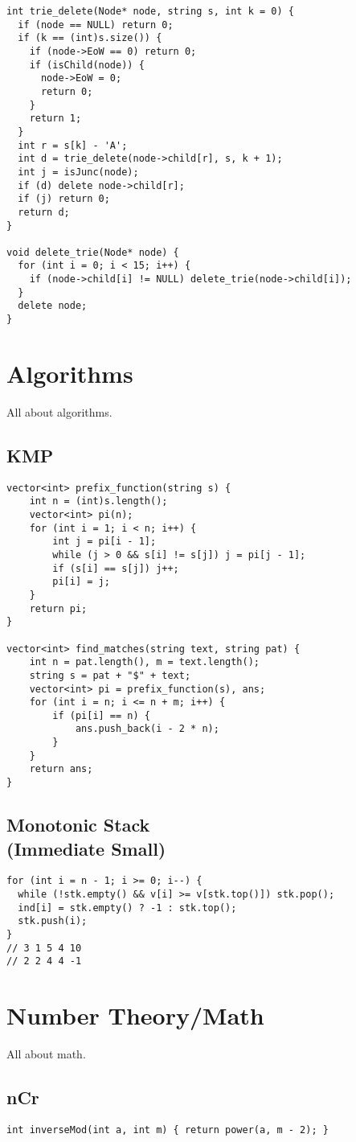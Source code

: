 \documentclass[10pt, a4paper]{article}
\begin{document}
\begin{multicols}{2}
\begin{lstlisting}
int trie_delete(Node* node, string s, int k = 0) {
  if (node == NULL) return 0;
  if (k == (int)s.size()) {
    if (node->EoW == 0) return 0;
    if (isChild(node)) {
      node->EoW = 0;
      return 0;
    }
    return 1;
  }
  int r = s[k] - 'A';
  int d = trie_delete(node->child[r], s, k + 1);
  int j = isJunc(node);
  if (d) delete node->child[r];
  if (j) return 0;
  return d;
}

void delete_trie(Node* node) {
  for (int i = 0; i < 15; i++) {
    if (node->child[i] != NULL) delete_trie(node->child[i]);
  }
  delete node;
}
\end{lstlisting}
\section{Algorithms}
All about algorithms.
\subsection{KMP}
\begin{lstlisting}
vector<int> prefix_function(string s) {
    int n = (int)s.length();
    vector<int> pi(n);
    for (int i = 1; i < n; i++) {
        int j = pi[i - 1];
        while (j > 0 && s[i] != s[j]) j = pi[j - 1];
        if (s[i] == s[j]) j++;
        pi[i] = j;
    }
    return pi;
}

vector<int> find_matches(string text, string pat) {
    int n = pat.length(), m = text.length();
    string s = pat + "$" + text;
    vector<int> pi = prefix_function(s), ans;
    for (int i = n; i <= n + m; i++) {
        if (pi[i] == n) {
            ans.push_back(i - 2 * n);
        }
    }
    return ans;
}
\end{lstlisting}
\subsection{Monotonic Stack\\(Immediate Small)}
\begin{lstlisting}
for (int i = n - 1; i >= 0; i--) {
  while (!stk.empty() && v[i] >= v[stk.top()]) stk.pop();
  ind[i] = stk.empty() ? -1 : stk.top();
  stk.push(i);
}
// 3 1 5 4 10
// 2 2 4 4 -1
\end{lstlisting}

\section{Number Theory/Math}
All about math.
\subsection{nCr}
\begin{lstlisting}
int inverseMod(int a, int m) { return power(a, m - 2); }


\end{lstlisting}
\end{multicols}
\end{document}
